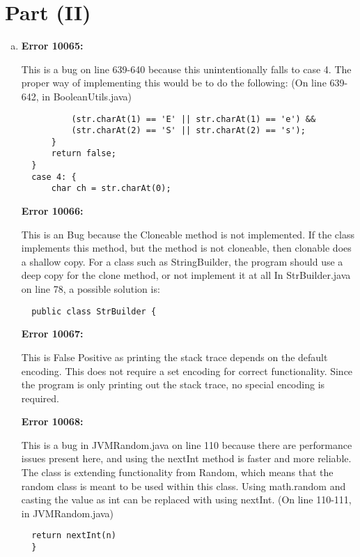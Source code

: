 \documentclass{article}
\begin{document}
  \section*{Part (II)}
  \begin{enumerate}[(a)]
  \item
  \textbf{Error 10065:}

  This is a bug on line 639-640 because this unintentionally falls to case 4.  The proper way of implementing this would be to do the following: (On line 639-642, in BooleanUtils.java)

  \begin{lstlisting}
          (str.charAt(1) == 'E' || str.charAt(1) == 'e') &&
          (str.charAt(2) == 'S' || str.charAt(2) == 's');
      }
      return false;
  }
  case 4: {
      char ch = str.charAt(0);
  \end{lstlisting}

  \textbf{Error 10066:}

  This is an Bug because the Cloneable method is not implemented. If the class implements this method, but the method is not cloneable, then clonable does a shallow copy. For a class such as StringBuilder, the program should use a deep copy for the clone method, or not implement it at all In StrBuilder.java on line 78, a possible solution is:

  \begin{lstlisting}
  public class StrBuilder {
  \end{lstlisting}

  \textbf{Error 10067:}

  This is False Positive as printing the stack trace depends on the default encoding. This does not require a set encoding for correct functionality. Since the program is only printing out the stack trace, no special encoding is required.

  \textbf{Error 10068:}

  This is a bug in JVMRandom.java on line 110 because there are performance issues present here, and using the nextInt method is faster and more reliable. The class is extending functionality from Random, which means that the random class is meant to be used  within this class. Using math.random and casting the value as int can be replaced with using nextInt. (On line 110-111, in JVMRandom.java)

  \begin{lstlisting}
  return nextInt(n)
  }
  \end{lstlisting}


\end{enumerate}
\end{document}
